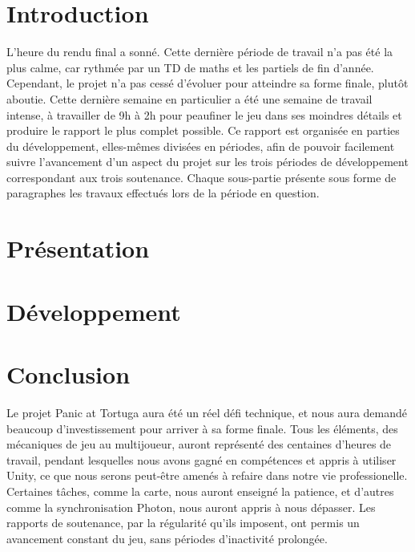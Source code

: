 \documentclass[french]{article}
\begin{document}


\tableofcontents
\newpage

\pagestyle{fancy}

\section{Introduction}

L'heure du rendu final a sonné. Cette dernière période de travail n'a pas été la plus calme, car rythmée par un TD de maths et les partiels de fin d'année.
Cependant, le projet n'a pas cessé d'évoluer pour atteindre sa forme finale, plutôt aboutie. Cette dernière semaine en particulier a été une semaine 
de travail intense, à travailler de 9h à 2h pour peaufiner le jeu dans ses moindres détails et produire le rapport le plus complet possible.
Ce rapport est organisée en parties du développement, elles-mêmes divisées en périodes, afin de pouvoir facilement suivre l'avancement d'un 
aspect du projet sur les trois périodes de développement correspondant aux trois soutenance. Chaque sous-partie présente sous forme de paragraphes 
les travaux effectués lors de la période en question.

\newpage
\section{Présentation}

\section{Développement}












\newpage

\section{Conclusion}

Le projet Panic at Tortuga aura été un réel défi technique, et nous aura demandé beaucoup d'investissement pour arriver à sa forme finale. Tous les éléments, 
des mécaniques de jeu au multijoueur, auront représenté des centaines d'heures de travail, pendant lesquelles nous avons gagné en compétences et appris à utiliser 
Unity, ce que nous serons peut-être amenés à refaire dans notre vie professionelle. Certaines tâches, comme la carte, nous auront enseigné la patience, et d'autres 
comme la synchronisation Photon, nous auront appris à nous dépasser. Les rapports de soutenance, par la régularité qu'ils imposent, ont permis un avancement 
constant du jeu, sans périodes d'inactivité prolongée. 


\listoffigures
\listoftables
\end{document}

